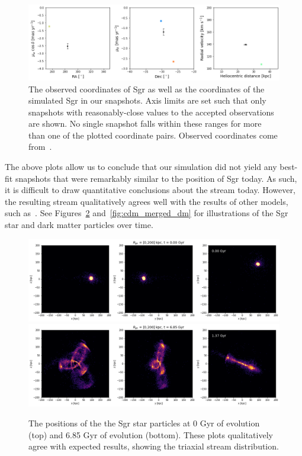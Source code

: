\begin{figure}[t]
    \centering
    \includegraphics[width=0.9\linewidth]{fig/cdm/merged_obs_coords.png}
    \caption{
        The observed coordinates of Sgr as well as the coordinates of the
        simulated Sgr in our snapshots. Axis limits are set such that only
        snapshots with reasonably-close values to the accepted observations are
        shown. No single snapshot falls within these ranges for more than one of
        the plotted coordinate pairs. Observed coordinates come
        from~\cite{nasa_nasaipac_nodate,kunder_distance_2009,massari_hubble_2013,bellazzini_nucleus_2008}.
    }
    \label{fig:cdm_merged_coords}
\end{figure}

The above plots allow us to conclude that our simulation did not yield any
best-fit snapshots that were remarkably similar to the position of Sgr today. As
such, it is difficult to draw quantitative conclusions about the stream today.
However, the resulting stream qualitatively agrees well with the results of
other models, such as~\cite{dierickx_predicted_2017}. See
Figures~\ref{fig:cdm_merged_stars} and~\ref{fig:cdm_merged_dm} for
illustrations of the Sgr star and dark matter particles over time.

\begin{figure}[t]
    \centering
    \includegraphics[width=0.9\linewidth]{fig/cdm/merged_star_0.png}
    \includegraphics[width=0.9\linewidth]{fig/cdm/merged_star_685.png}
    \caption{
        The positions of the the Sgr star particles at 0 Gyr of evolution
        (top) and 6.85 Gyr of evolution (bottom). These plots qualitatively
        agree with expected results, showing the triaxial stream distribution.
    }
    \label{fig:cdm_merged_stars}
\end{figure}

